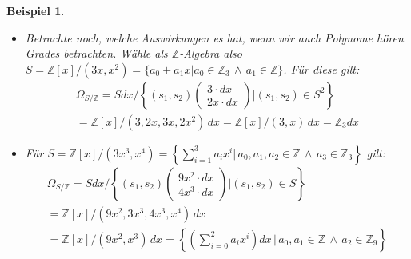 \documentclass[10pt,a4paper]{report}
\newcounter{Aussage}[chapter]
\newtheorem{bsp}[Aussage]{Beispiel}
\newcommand{\divR}[2]{\Omega_{#1/#2}}
\begin{document}
\begin{bsp}
\begin{itemize}
\item[(3.4)] Betrachte noch, welche Auswirkungen es hat, wenn wir auch Polynome hören Grades betrachten. Wähle als $\mathbb{Z}$-Algebra also\\ $S = \mathbb{Z}[x]/(3x,x^2) = \lbrace a_0 + a_1x \vert a_0 \in \mathbb{Z}_3 \, \wedge \, a_1 \in \mathbb{Z} \rbrace$. Für diese gilt:
\begin{gather*}
\divR{S}{\mathbb{Z}} = Sdx/\left\lbrace (s_1,s_2)
\begin{pmatrix}
3 \cdot dx\\
2x \cdot dx
\end{pmatrix}
\vert (s_1,s_2) \in S^2 \right\rbrace\\
=\mathbb{Z}[x]/(3,2x,3x,2x^2) \, dx
=\mathbb{Z}[x]/(3,x) \, dx
=\mathbb{Z}_3 dx
\end{gather*}

\item[(3.5)] Für $S = \mathbb{Z}[x]/(3x^3, x^4) = \left\lbrace \sum_{i = 1}^3 a_ix^i \vert \, a_0 , a_1 , a_2 \in \mathbb{Z} \, \wedge \, a_3 \in \mathbb{Z}_3 \right\rbrace$ gilt:
\begin{gather*}
\divR{S}{\mathbb{Z}} = Sdx/\left\lbrace (s_1,s_2)
\begin{pmatrix}
9x^2 \cdot dx\\
4x^3 \cdot dx
\end{pmatrix}
\vert (s_1,s_2) \in S \right\rbrace\\
=\mathbb{Z}[x]/(9x^2,3x^3,4x^3,x^4)\,dx \\
= \mathbb{Z}[x]/(9x^2,x^3) \, dx 
= \left\lbrace \left( \sum_{i = 0}^2 a_ix^i \right)dx \, \vert \, a_0,a_1 \in \mathbb{Z} \, \wedge \, a_2 \in \mathbb{Z}_9 \right\rbrace
\end{gather*}


\end{itemize}
\end{bsp}
\end{document}

